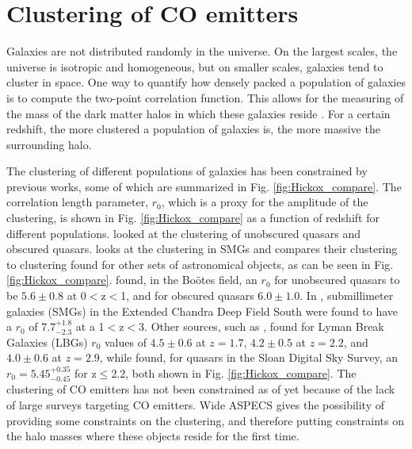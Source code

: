 \chapter{Clustering of CO emitters}

Galaxies are not distributed randomly in the universe. On the largest scales, the universe is isotropic and homogeneous, but on smaller scales, galaxies tend to cluster in space. One way to quantify how densely packed a population of galaxies is to compute the two-point correlation function. This allows for the measuring of the mass of the dark matter halos in which these galaxies reside \cite{hickox2011clustering}. For a certain redshift, the more clustered a population of galaxies is, the more massive the surrounding halo.

The clustering of different populations of galaxies has been constrained by previous works, some of which are summarized in Fig. \ref{fig:Hickox_compare}. The correlation length parameter, $r_0$, which is a proxy for the amplitude of the clustering, is shown in Fig. \ref{fig:Hickox_compare} as a function of redshift for different populations. \cite{hickox2011clustering} looked at the clustering of unobscured quasars and obscured quasars. \cite{10.1111/j.1365-2966.2011.20303.x} looks at the clustering in SMGs and compares their clustering to clustering found for other sets of astronomical objects, as can be seen in Fig. \ref{fig:Hickox_compare}. \cite{hickox2011clustering} found, in the Bo\"otes field, an $r_0$ for unobscured quasars to be $5.6 \pm 0.8$ at 0$<$z$<$1, and for obscured quasars $6.0 \pm 1.0 $. In \cite{10.1111/j.1365-2966.2011.20303.x}, submillimeter galaxies (SMGs) in the Extended Chandra Deep Field South were found to have a $r_0$ of $7.7_{-2.3}^{+1.8}$ at a 1$<$z$<$3. Other sources, such as \cite{adelberger2005spatial}, found for Lyman Break Galaxies (LBGs) $r_0$ values of $4.5 \pm 0.6$ at $z = 1.7$, $4.2 \pm 0.5$ at $z = 2.2$, and $4.0 \pm 0.6$ at $z = 2.9$, while \cite{ross2009clustering} found, for quasars in the Sloan Digital Sky Survey, an $r_0 = 5.45_{-0.45}^{+0.35}$ for z$\leq$2.2, both shown in Fig. \ref{fig:Hickox_compare}. The clustering of CO emitters has not been constrained as of yet because of the lack of large surveys targeting CO  emitters. Wide ASPECS gives the possibility of providing some constraints on the clustering, and therefore putting constraints on the halo masses where these objects reside for the first time.

